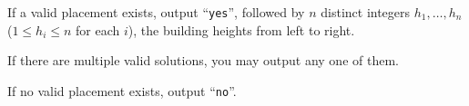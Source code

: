 
  If a valid placement exists, output ``\texttt{yes}'', followed by $n$ distinct integers $h_1,\dots,h_n$ ($1 \le h_i \le n$ for each $i$), the building heights from left to right.

  If there are multiple valid solutions, you may output any one of them.

  If no valid placement exists, output ``\texttt{no}''.
